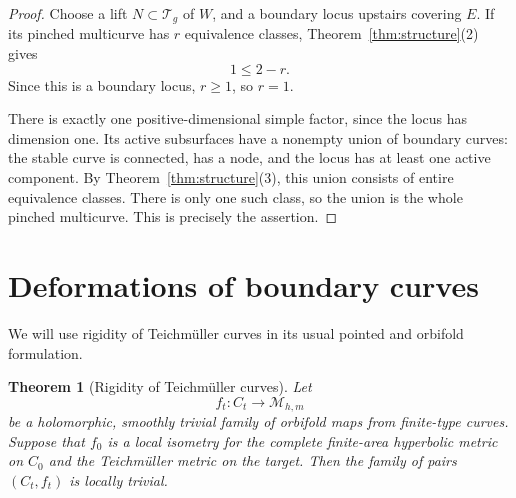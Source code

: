 \documentclass[11pt]{article}
\newcommand{\M}{\mathcal M}
\newcommand{\T}{\mathcal T}
\newtheorem{theorem}{Theorem}[section]
\theoremstyle{remark}
\begin{document}
\begin{proof}
Choose a lift \(N\subset\T_g\) of \(W\), and a boundary locus
upstairs covering \(E\). If its pinched multicurve has \(r\)
equivalence classes, Theorem~\ref{thm:structure}(2) gives
\[
1\leq 2-r.
\]
Since this is a boundary locus, \(r\geq1\), so \(r=1\).

There is exactly one positive-dimensional simple factor, since
the locus has dimension one. Its active subsurfaces have a
nonempty union of boundary curves: the stable curve is connected,
has a node, and the locus has at least one active component.
By Theorem~\ref{thm:structure}(3), this union consists of entire
equivalence classes. There is only one such class, so the union
is the whole pinched multicurve. This is precisely the assertion.
\end{proof}


\section{Deformations of boundary curves}

We will use rigidity of Teichm\"uller curves in its usual
pointed and orbifold formulation.

\begin{theorem}[Rigidity of Teichm\"uller curves]\label{thm:McM}
Let
\[
f_t:C_t\longrightarrow \M_{h,m}
\]
be a holomorphic, smoothly trivial family of orbifold maps from
finite-type curves. Suppose that \(f_0\) is a local isometry for
the complete finite-area hyperbolic metric on \(C_0\) and the
Teichm\"uller metric on the target. Then the family of pairs
\((C_t,f_t)\) is locally trivial.
\end{theorem}
\end{document}
